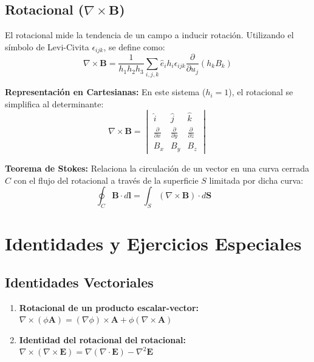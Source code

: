 \documentclass[a4paper]{article}
\begin{document}
\subsection{Rotacional ($\nabla \times \mathbf{B}$)}

El rotacional mide la tendencia de un campo a inducir rotación. Utilizando el símbolo de Levi-Civita $\epsilon_{ijk}$, se define como:
\begin{equation}
    \nabla \times \mathbf{B} = \frac{1}{h_1 h_2 h_3} \sum_{i,j,k} \hat{e}_i h_i \epsilon_{ijk} \frac{\partial}{\partial u_j} (h_k B_k)
\end{equation}

\textbf{Representación en Cartesianas:}
En este sistema ($h_i = 1$), el rotacional se simplifica al determinante:
\begin{equation}
    \nabla \times \mathbf{B} = \begin{vmatrix} 
    \hat{i} & \hat{j} & \hat{k} \\
    \frac{\partial}{\partial x} & \frac{\partial}{\partial y} & \frac{\partial}{\partial z} \\
    B_x & B_y & B_z
    \end{vmatrix}
\end{equation}

\textbf{Teorema de Stokes:} Relaciona la circulación de un vector en una curva cerrada $C$ con el flujo del rotacional a través de la superficie $S$ limitada por dicha curva:
\begin{equation}
    \oint_C \mathbf{B} \cdot d\mathbf{l} = \int_S (\nabla \times \mathbf{B}) \cdot d\mathbf{S} \quad
\end{equation}

\section{Identidades y Ejercicios Especiales}

\subsection{Identidades Vectoriales}
\begin{enumerate}
    \item \textbf{Rotacional de un producto escalar-vector:}
    $\nabla \times (\phi \mathbf{A}) = (\nabla \phi) \times \mathbf{A} + \phi (\nabla \times \mathbf{A})$
    \item \textbf{Identidad del rotacional del rotacional:}
    $\nabla \times (\nabla \times \mathbf{E}) = \nabla(\nabla \cdot \mathbf{E}) - \nabla^2 \mathbf{E}$
\end{enumerate}
\end{document}
